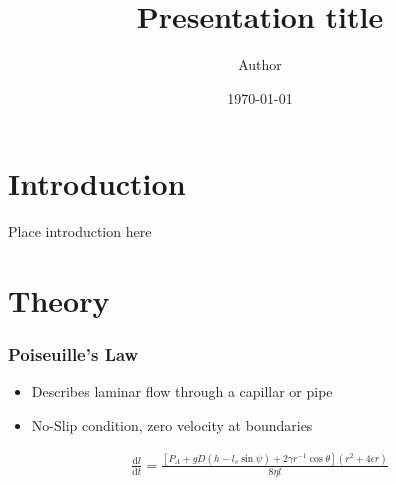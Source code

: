 \documentclass[xcolor=dvipsnames]{beamer}
\title{Presentation title}
\author{Author}
\date{\today}
\begin{document}
\maketitle


\section{Introduction}
\begin{frame}
    Place introduction here
\end{frame}


\section{Theory}
\begin{frame}
    \frametitle{Poiseuille's Law}
    \begin{itemize}
        \item Describes laminar flow through a capillar or pipe
        \item No-Slip condition, zero velocity at boundaries \cite{washburn}
    \end{itemize}
    \begin{definition}
        \begin{align}
            \frac{\text{d}l}{\text{d}t} = \frac{\left[ P_A + gD(h-l_s\sin \psi) + 2\gamma r^{-1}\cos \theta\right](r^2 + 4\epsilon r)}{8\eta l}
        \end{align} 
    \end{definition}
\end{frame}

\begin{frame}
    
    
\end{frame}
\end{document}

